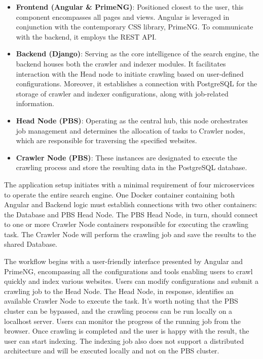 \begin{itemize}
  \item \textbf{Frontend (Angular \& PrimeNG)}: Positioned closest to the user, this component encompasses all pages and views. Angular is leveraged in conjunction with the contemporary CSS library, PrimeNG. To communicate with the backend, it employs the REST API.
  \item \textbf{Backend (Django)}: Serving as the core intelligence of the search engine, the backend houses both the crawler and indexer modules. It facilitates interaction with the Head node to initiate crawling based on user-defined configurations. Moreover, it establishes a connection with PostgreSQL for the storage of crawler and indexer configurations, along with job-related information.
  \item \textbf{Head Node (PBS)}: Operating as the central hub, this node orchestrates job management and determines the allocation of tasks to Crawler nodes, which are responsible for traversing the specified websites.
  \item \textbf{Crawler Node (PBS)}: These instances are designated to execute the crawling process and store the resulting data in the PostgreSQL database.
\end{itemize}

The application setup initiates with a minimal requirement of four microservices to operate the entire search engine. One Docker container containing both Angular and Backend logic must establish connections with two other containers: the Database and PBS Head Node. The PBS Head Node, in turn, should connect to one or more Crawler Node containers responsible for executing the crawling task. The Crawler Node will perform the crawling job and save the results to the shared Database.

The workflow begins with a user-friendly interface presented by Angular and PrimeNG, encompassing all the configurations and tools enabling users to crawl quickly and index various websites. Users can modify configurations and submit a crawling job to the Head Node. The Head Node, in response, identifies an available Crawler Node to execute the task. It's worth noting that the PBS cluster can be bypassed, and the crawling process can be run locally on a localhost server. Users can monitor the progress of the running job from the browser. Once crawling is completed and the user is happy with the result, the user can start indexing. The indexing job also does not support a distributed architecture and will be executed locally and not on the PBS cluster.


